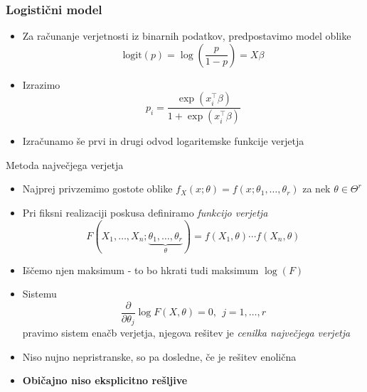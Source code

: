 \documentclass[10pt]{beamer}
\begin{document}
\begin{frame}[t]
    \frametitle{Logistični model}
    \begin{itemize}
        \item<1-> Za računanje verjetnosti iz binarnih podatkov, predpostavimo model oblike
        \[
            \textrm{logit}(p) = \log\left(\frac{p}{1-p}\right) = X\beta
        \]
        \item<2->Izrazimo 
        \[
            p_{i} = \frac{\exp(x_{i}^\top\beta)}{1 + \exp(x_{i}^\top\beta)}
        \]
        \pause
        \item<3> Izračunamo še prvi in drugi odvod logaritemske funkcije verjetja

    \end{itemize}


\end{frame}

\begin{frame}{Metoda največjega verjetja}
    \begin{itemize}
        \item Najprej privzemimo gostote oblike $f_{X}(x;\theta) = f(x;\theta_{1},\ldots,\theta_{r})$ za nek $\theta \in \Theta^{r}$
        
        \item Pri fiksni realizaciji poskusa definiramo \textit{funkcijo verjetja}
        \[ 
            F(X_{1},\ldots,X_{n};\underbrace{\theta_{1},\ldots,\theta_{r}}_{\theta}) = f(X_{1},\theta)\cdots f(X_{n},\theta) 
        \] \pause
        \item Iščemo njen maksimum - to bo hkrati tudi maksimum $\log(F)$
        \item Sistemu 
        \[
            \frac{\partial}{\partial \theta_{j}}\log F (X,\theta) = 0,~~j=1,\ldots,r
        \]
        pravimo sistem enačb verjetja, njegova rešitev je \textit{cenilka največjega verjetja}
        \pause
        \item Niso nujno nepristranske, so pa dosledne, če je rešitev enolična
        \item \textbf{Običajno niso eksplicitno rešljive}
    \end{itemize}
\end{frame}
\end{document}
